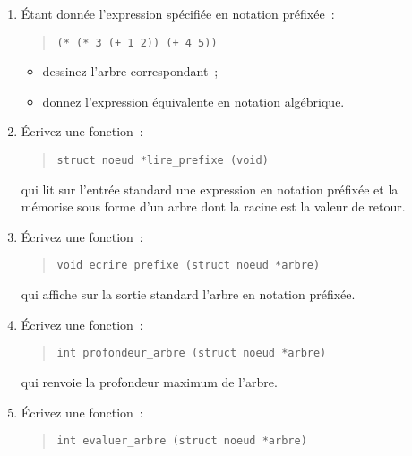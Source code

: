 \begin {enumerate}
    \item Étant donnée l'expression spécifiée en notation préfixée~:

	\begin {quote}
	    \tt (* (* 3 (+ 1 2)) (+ 4 5))
	\end {quote}

	\begin {itemize}
	    \item dessinez l'arbre correspondant~;
	    \item donnez l'expression équivalente en notation algébrique.
	\end {itemize}
    
    \item Écrivez une fonction~:

\begin {quote}
\begin {verbatim}
struct noeud *lire_prefixe (void)
\end{verbatim}
\end {quote}

	qui lit sur l'entrée standard une expression en notation préfixée
	et la mémorise sous forme d'un arbre dont la racine est la
	valeur de retour.

    \item Écrivez une fonction~:

\begin {quote}
\begin {verbatim}
void ecrire_prefixe (struct noeud *arbre)
\end{verbatim}
\end {quote}

	qui affiche sur la sortie standard l'arbre en notation préfixée.
    
    \item Écrivez une fonction~:

\begin {quote}
\begin {verbatim}
int profondeur_arbre (struct noeud *arbre)
\end{verbatim}
\end {quote}

	qui renvoie la profondeur maximum de l'arbre.

    \item Écrivez une fonction~:

\begin {quote}
\begin {verbatim}
int evaluer_arbre (struct noeud *arbre)
\end{verbatim}
\end {quote}


\end{enumerate}
